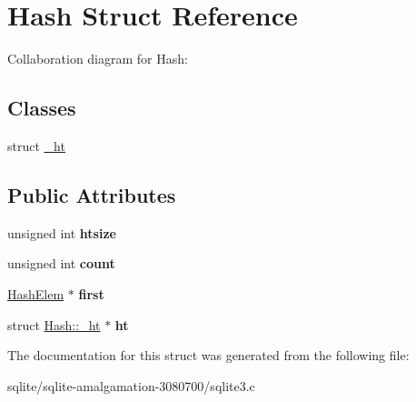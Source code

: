 \hypertarget{struct_hash}{\section{Hash Struct Reference}
\label{struct_hash}
}


Collaboration diagram for Hash\+:
\subsection*{Classes}
\begin{DoxyCompactItemize}
\item 
struct \hyperlink{struct_hash_1_1__ht}{\+\_\+ht}
\end{DoxyCompactItemize}
\subsection*{Public Attributes}
\begin{DoxyCompactItemize}
\item 
\hypertarget{struct_hash_a072258e24a38e09175f1308deb013bc8}{unsigned int {\bfseries htsize}}\label{struct_hash_a072258e24a38e09175f1308deb013bc8}

\item 
\hypertarget{struct_hash_a7ab16f173cdc347ffbe39eaa85ee6fda}{unsigned int {\bfseries count}}\label{struct_hash_a7ab16f173cdc347ffbe39eaa85ee6fda}

\item 
\hypertarget{struct_hash_a2cfc9936ca2a624c6492ab6557f4705b}{\hyperlink{struct_hash_elem}{Hash\+Elem} $\ast$ {\bfseries first}}\label{struct_hash_a2cfc9936ca2a624c6492ab6557f4705b}

\item 
\hypertarget{struct_hash_ac0f36e03746a3fe69643db08d93bc0c4}{struct \hyperlink{struct_hash_1_1__ht}{Hash\+::\+\_\+ht} $\ast$ {\bfseries ht}}\label{struct_hash_ac0f36e03746a3fe69643db08d93bc0c4}

\end{DoxyCompactItemize}


The documentation for this struct was generated from the following file\+:\begin{DoxyCompactItemize}
\item 
sqlite/sqlite-\/amalgamation-\/3080700/sqlite3.\+c\end{DoxyCompactItemize}
